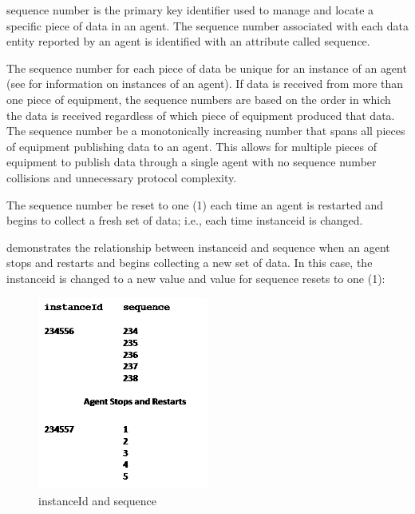 \gls{sequence number} is the primary key identifier used to manage and locate a specific piece of data in an \gls{agent}.  The \gls{sequence number} associated with each \gls{data entity} reported by an \gls{agent} is identified with an attribute called \gls{sequence}.

The \gls{sequence number} for each piece of data \MUST be unique for an instance of an \gls{agent} (see  for information on \glspl{instance} of an \gls{agent}).  If data is received from more than one piece of equipment, the \glspl{sequence number} are based on the order in which the data is received regardless of which piece of equipment produced that data.  The \gls{sequence number} \MUST be a monotonically increasing number that spans all pieces of equipment publishing data to an \gls{agent}.  This allows for multiple pieces of equipment to publish data through a single \gls{agent} with no \gls{sequence number} collisions and unnecessary protocol complexity.

The \gls{sequence number} \MUST be reset to one (1) each time an \gls{agent} is restarted and begins to collect a fresh set of data; i.e., each time \gls{instanceid} is changed.

 demonstrates the relationship between \gls{instanceid} and sequence when an \gls{agent} stops and restarts and begins collecting a new set of data.  In this case, the \gls{instanceid} is changed to a new value and value for \gls{sequence} resets to one (1):

\begin{figure}[ht]
  \centering
  \includegraphics[width=0.5\textwidth]{figures/instanceid-and-sequence.png}
  \caption{instanceId and sequence}
  \label{fig:instanceid-and-sequence}
\end{figure}

